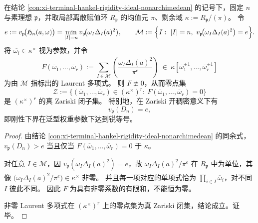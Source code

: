\begin{proposition}\label{prop:xi-terminal-hankel-rigidity-generic-sharpness-zariski}
在结论 \ref{con:xi-terminal-hankel-rigidity-ideal-nonarchimedean} 的记号下，固定 \(n\) 与素理想 \(\mathfrak p\)，并取局部离散赋值环 \(R_{\mathfrak p}\) 的均值元 \(\pi\)、剩余域 \(\kappa:=R_{\mathfrak p}/(\pi)\)。
令
\[
e:=v_{\mathfrak p}\!\bigl(\mathfrak H_n(a,\omega)\bigr)=\min_{|I|=n}v_{\mathfrak p}\!\bigl(\omega_I\Delta_I(a)^2\bigr),
\qquad
\mathcal M:=\Bigl\{I:\ |I|=n,\ v_{\mathfrak p}\!\bigl(\omega_I\Delta_I(a)^2\bigr)=e\Bigr\}.
\]
将 \(\overline{\omega_i}\in \kappa^\times\) 视为参数，并令
\[
F(\overline\omega_1,\dots,\overline\omega_r)
:=
\sum_{I\in\mathcal M}\overline{\left(\frac{\omega_I\Delta_I(a)^2}{\pi^{e}}\right)}
\ \in\ \kappa[\overline\omega_1^{\pm 1},\dots,\overline\omega_r^{\pm 1}]
\]
为由 \(\mathcal M\) 指标出的 Laurent 多项式。
则 \(F\not\equiv 0\)，从而零点集
\[
\mathcal Z:=\{(\overline\omega_1,\dots,\overline\omega_r)\in(\kappa^\times)^r:\ F(\overline\omega_1,\dots,\overline\omega_r)=0\}
\]
是 \((\kappa^\times)^r\) 的真 Zariski 闭子集。
特别地，在 Zariski 开稠密意义下有
\[
v_{\mathfrak p}(D_n)=e,
\]
即刚性下界在泛型权重参数下达到锐等号。
\end{proposition}
\begin{proof}
由结论 \ref{con:xi-terminal-hankel-rigidity-ideal-nonarchimedean} 的同余式，
\(
v_{\mathfrak p}(D_n)>e
\)
当且仅当 \(F(\overline\omega_1,\dots,\overline\omega_r)=0\) 于 \(\kappa\)。
\par
对任意 \(I\in\mathcal M\)，因
\(
v_{\mathfrak p}(\omega_I\Delta_I(a)^2)=e
\)，故 \(\omega_I\Delta_I(a)^2/\pi^e\) 在 \(R_{\mathfrak p}\) 中为单位，其像
\(
\overline{\bigl(\omega_I\Delta_I(a)^2/\pi^e\bigr)}
\in \kappa^\times
\)
非零。
并且每一项对应的单项式恰为 \(\prod_{i\in I}\overline\omega_i\)，对不同 \(I\) 彼此不同。
因此 \(F\) 为具有非零系数的有限和，不能恒为零。
\par
非零 Laurent 多项式在 \((\kappa^\times)^r\) 上的零点集为真 Zariski 闭集，结论成立。证毕。
\end{proof}

